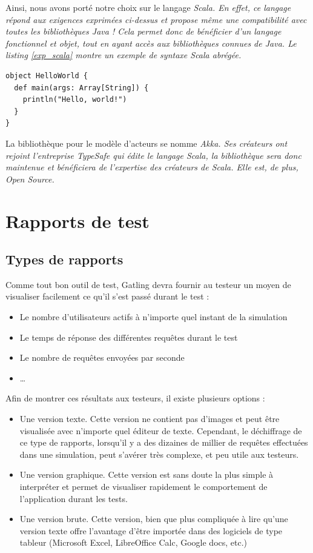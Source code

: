 Ainsi, nous avons porté notre choix sur le langage \em{Scala}. En effet, ce langage répond aux exigences exprimées ci-dessus et propose même une compatibilité avec toutes les bibliothèques Java ! Cela permet donc de bénéficier d'un langage fonctionnel et objet, tout en ayant accès aux bibliothèques connues de Java. Le listing \ref{exp_scala} montre un exemple de syntaxe Scala abrégée.

\begin{lstlisting}[caption={Exemple de code Scala},label=exp_scala]
object HelloWorld {
  def main(args: Array[String]) {
    println("Hello, world!")
  }
}
\end{lstlisting}

La bibliothèque pour le modèle d'acteurs se nomme \em{Akka}. Ses créateurs ont rejoint l'entreprise TypeSafe qui édite le langage Scala, la bibliothèque sera donc maintenue et bénéficiera de l'expertise des créateurs de Scala. Elle est, de plus, Open Source.

\section{Rapports de test}
\subsection{Types de rapports}

Comme tout bon outil de test, Gatling devra fournir au testeur un moyen de visualiser facilement ce qu'il s'est passé durant le test :
\begin{itemize}
  \item Le nombre d'utilisateurs actifs à n'importe quel instant de la simulation
  \item Le temps de réponse des différentes requêtes durant le test
  \item Le nombre de requêtes envoyées par seconde
  \item \ldots
\end{itemize}

Afin de montrer ces résultats aux testeurs, il existe plusieurs options : 
\begin{itemize}
  \item Une version texte. Cette version ne contient pas d'images et peut être visualisée avec n'importe quel éditeur de texte. Cependant, le déchiffrage de ce type de rapports, lorsqu'il y a des dizaines de millier de requêtes effectuées dans une simulation, peut s'avérer très complexe, et peu utile aux testeurs.
  \item Une version graphique. Cette version est sans doute la plus simple à interpréter et permet de visualiser rapidement le comportement de l'application durant les tests.
  \item Une version brute. Cette version, bien que plus compliquée à lire qu'une version texte offre l'avantage d'être importée dans des logiciels de type tableur (Microsoft Excel, LibreOffice Calc, Google docs, etc.)
\end{itemize}

